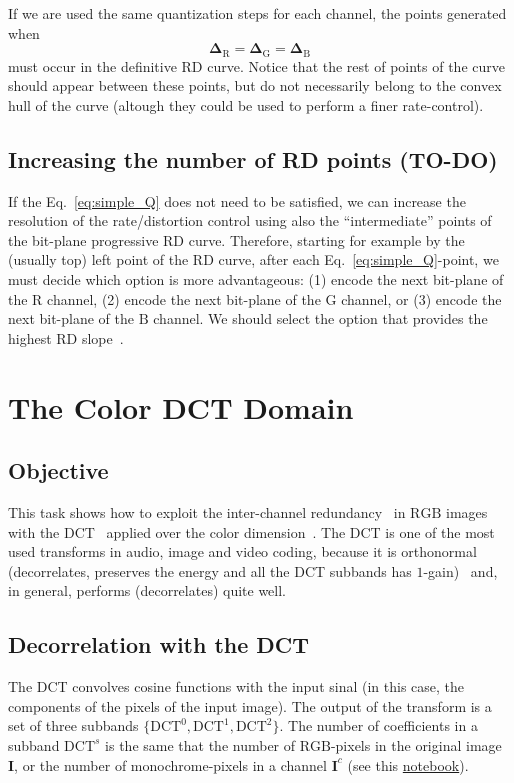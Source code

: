 If we are used the same quantization steps for each channel, the
points generated when
\begin{equation}
  \mathbf{\Delta}_{\text{R}} = \mathbf{\Delta}_{\text{G}} = \mathbf{\Delta}_{\text{B}}
\end{equation}
must occur in the definitive RD curve. Notice that the rest of points
of the curve should appear between these points, but do not
necessarily belong to the convex hull of the curve (altough they could
be used to perform a finer rate-control).

\subsection{Increasing the number of RD points (TO-DO)}
\label{sec:increasing}
If the Eq.~\eqref{eq:simple_Q} does not need to be satisfied, we can
increase the resolution of the rate/distortion control using also the
``intermediate'' points of the bit-plane progressive RD
curve. Therefore, starting for example by the (usually top) left point
of the RD curve, after each Eq.~\eqref{eq:simple_Q}-point, we must
decide which option is more advantageous: (1) encode the next
bit-plane of the $\text{R}$ channel, (2) encode the next bit-plane of
the $\text{G}$ channel, or (3) encode the next bit-plane of the
$\text{B}$ channel. We should select the option that provides the
highest RD slope~\cite{vruiz__information_theory}.



\section{The Color DCT Domain}

\subsection{Objective}
This task shows how to exploit the inter-channel
redundancy~\cite{vruiz__visual_redundancy,vruiz__information_theory}
in $\text{RGB}$ images with the DCT~\cite{vruiz__DCT} applied over the
color dimension~\cite{vruiz__image_IO}. The DCT is one of the most
used transforms in audio, image and video coding, because it is
orthonormal (decorrelates, preserves the energy and all the DCT
subbands has $1$-gain)~\cite{vruiz__transform_coding} and, in general,
performs (decorrelates) quite well.

\subsection{Decorrelation with the DCT}
The DCT convolves cosine functions with the input sinal (in this case,
the components of the pixels of the input image). The output of the
transform is a set of three subbands $\{\text{DCT}^0, \text{DCT}^1,
\text{DCT}^2\}$. The number of coefficients in a subband
$\text{DCT}^s$ is the same that the number of $\text{RGB}$-pixels in
the original image $\mathbf{I}$, or the number of monochrome-pixels in
a channel $\mathbf{I}^c$ (see this
\href{https://github.com/Sistemas-Multimedia/Sistemas-Multimedia.github.io/blob/master/contents/RGB_DCT_SQ/RGB_DCT_SQ.ipynb}{notebook}).


